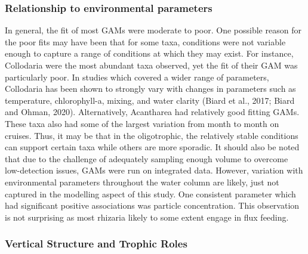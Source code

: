 \documentclass[
]{article}
\begin{document}
\hypertarget{relationship-to-environmental-parameters}{%
\subsubsection{Relationship to environmental
parameters}\label{relationship-to-environmental-parameters}}

In general, the fit of most GAMs were moderate to poor. One possible
reason for the poor fits may have been that for some taxa, conditions
were not variable enough to capture a range of conditions at which they
may exist. For instance, Collodaria were the most abundant taxa
observed, yet the fit of their GAM was particularly poor. In studies
which covered a wider range of parameters, Collodaria has been shown to
strongly vary with changes in parameters such as temperature,
chlorophyll-a, mixing, and water clarity (Biard et al., 2017; Biard and
Ohman, 2020). Alternatively, Acantharea had relatively good fitting
GAMs. These taxa also had some of the largest variation from month to
month on cruises. Thus, it may be that in the oligotrophic, the
relatively stable conditions can support certain taxa while others are
more sporadic. It should also be noted that due to the challenge of
adequately sampling enough volume to overcome low-detection issues, GAMs
were run on integrated data. However, variation with environmental
parameters throughout the water column are likely, just not captured in
the modelling aspect of this study. One consistent parameter which had
significant positive associations was particle concentration. This
observation is not surprising as most rhizaria likely to some extent
engage in flux feeding.

\hypertarget{vertical-structure-and-trophic-roles}{%
\subsubsection{Vertical Structure and Trophic
Roles}\label{vertical-structure-and-trophic-roles}}
\end{document}
